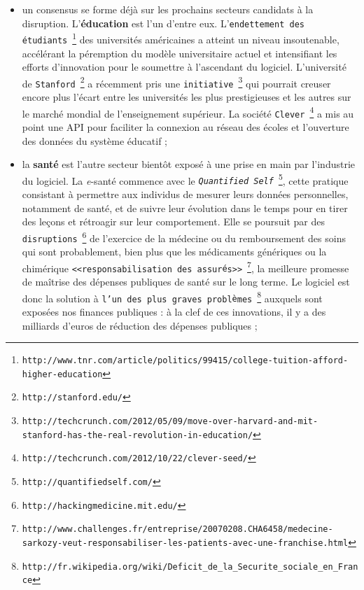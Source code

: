 \documentclass[11pt,twoside,a4paper]{article}
\begin{document}
\begin{itemize}
	~\\ %
	\item un consensus se forme d{\'e}j{\`a} sur les prochains secteurs candidats {\`a} la disruption. L'\textbf{{\'e}ducation} est l'un d'entre eux. L'\texttt{endettement des {\'e}tudiants}~\footnote{\texttt{http://www.tnr.com/article/politics/99415/college-tuition-afford-higher-education}} des universit{\'e}s am{\'e}ricaines a atteint un niveau insoutenable, acc{\'e}l{\'e}rant la p{\'e}remption du mod{\`e}le universitaire actuel et intensifiant les efforts d'innovation pour le soumettre {\`a} l'ascendant du logiciel. L'universit{\'e} de \texttt{Stanford}~\footnote{\texttt{http://stanford.edu/}} a r{\'e}cemment pris une \texttt{initiative}~\footnote{\texttt{http://techcrunch.com/2012/05/09/move-over-harvard-and-mit-stanford-has-the-real-revolution-in-education/}} qui pourrait creuser encore plus l'{\'e}cart entre les universit{\'e}s les plus prestigieuses et les autres sur le march{\'e} mondial de l'enseignement sup{\'e}rieur. La soci{\'e}t{\'e} \texttt{Clever}~\footnote{\texttt{http://techcrunch.com/2012/10/22/clever-seed/}} a mis au point une API pour faciliter la connexion au r{\'e}seau des {\'e}coles et l'ouverture des donn{\'e}es du syst{\`e}me {\'e}ducatif ;
	\item la \textbf{sant{\'e}} est l'autre secteur bient{\^o}t expos{\'e} {\`a} une prise en main par l'industrie du logiciel. La \emph{e}-sant{\'e} commence avec le \texttt{\emph{Quantified Self}}~\footnote{\texttt{http://quantifiedself.com/}}, cette pratique consistant {\`a} permettre aux individus de mesurer leurs donn{\'e}es personnelles, notamment de sant{\'e}, et de suivre leur {\'e}volution dans le temps pour en tirer des le\c{c}ons et r{\'e}troagir sur leur comportement. Elle se poursuit par des \texttt{disruptions}~\footnote{\texttt{http://hackingmedicine.mit.edu/}} de l'exercice de la m{\'e}decine ou du remboursement des soins qui sont probablement, bien plus que les m{\'e}dicaments g{\'e}n{\'e}riques ou la chim{\'e}rique \texttt{<<responsabilisation des assur{\'e}s>>}~\footnote{\texttt{http://www.challenges.fr/entreprise/20070208.CHA6458/medecine-sarkozy-veut-responsabiliser-les-patients-avec-une-franchise.html}}, la meilleure promesse de ma{\^i}trise des d{\'e}penses publiques de sant{\'e} sur le long terme. Le logiciel est donc la solution {\`a} \texttt{l'un des plus graves probl{\`e}mes}~\footnote{\texttt{http://fr.wikipedia.org/wiki/Deficit\_de\_la\_Securite\_sociale\_en\_France}} auxquels sont expos{\'e}es nos finances publiques : {\`a} la clef de ces innovations, il y a des milliards d'euros de r{\'e}duction des d{\'e}penses publiques ;

\end{itemize}
\end{document}
